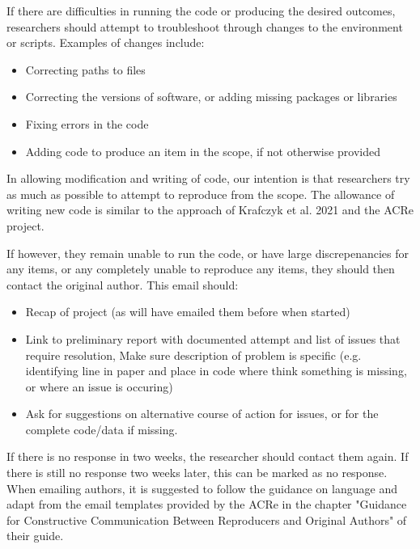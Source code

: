 If there are difficulties in running the code or producing the desired outcomes, researchers should attempt to troubleshoot through changes to the environment or scripts. Examples of changes include:
\begin{itemize}
    \item Correcting paths to files
    \item Correcting the versions of software, or adding missing packages or libraries
    \item Fixing errors in the code
    \item Adding code to produce an item in the scope, if not otherwise provided
\end{itemize}

In allowing modification and writing of code, our intention is that researchers try as much as possible to attempt to reproduce from the scope. The allowance of writing new code is similar to the approach of Krafczyk et al. 2021\autocite{krafczyk_learning_2021} and the ACRe project\autocite{berkeley_initiative_for_transparency_in_the_social_sciences_guide_2022}.

If however, they remain unable to run the code, or have large discrepenancies for any items, or any completely unable to reproduce any items, they should then contact the original author. This email should:
\begin{itemize}
    \item Recap of project (as will have emailed them before when started)
    \item Link to preliminary report with documented attempt and list of issues that require resolution, Make sure description of problem is specific (e.g. identifying line in paper and place in code where think something is missing, or where an issue is occuring)
    \item Ask for suggestions on alternative course of action for issues, or for the complete code/data if missing.
\end{itemize}

If there is no response in two weeks, the researcher should contact them again. If there is still no response two weeks later, this can be marked as no response. When emailing authors, it is suggested to follow the guidance on language and adapt from the email templates provided by the ACRe in the chapter "Guidance for Constructive Communication Between Reproducers and Original Authors" of their guide.\autocite{berkeley_initiative_for_transparency_in_the_social_sciences_guide_2022}

